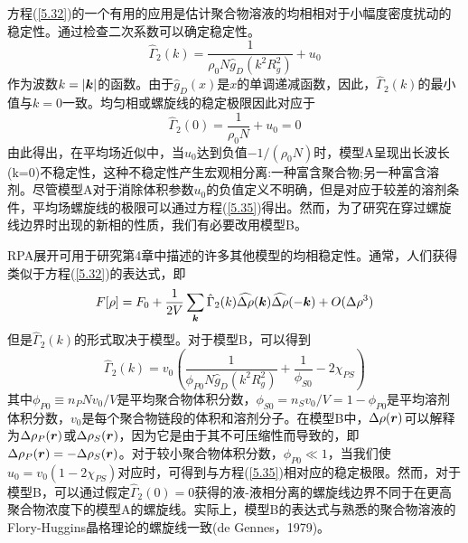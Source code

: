 方程(\ref{5.32})的一个有用的应用是估计聚合物溶液的均相相对于小幅度密度扰动的稳定性。通过检查二次系数可以确定稳定性。
\begin{equation}\label{5.34}
\hat{\Gamma}_2(k)=\frac{1}{\rho_0N\hat{g}_D(k^2R_g^2)}+u_0
\end{equation}
作为波数$k=\left|\bm{k}\right|$的函数。由于$\hat{g}_D(x)$是$x$的单调递减函数，因此，$\hat{\Gamma}_2(k)$的最小值与$k=0$一致。均匀相或螺旋线的稳定极限因此对应于
\begin{equation}\label{5.35}
\hat{\Gamma}_2(0)=\frac{1}{\rho_0N}+u_0=0
\end{equation}
由此得出，在平均场近似中，当$u_0$达到负值$-1/(\rho_0N)$时，模型A呈现出长波长(k=0)不稳定性，这种不稳定性产生宏观相分离:一种富含聚合物;另一种富含溶剂。尽管模型A对于消除体积参数$u_0$的负值定义不明确，但是对应于较差的溶剂条件，平均场螺旋线的极限可以通过方程(\ref{5.35})得出。然而，为了研究在穿过螺旋线边界时出现的新相的性质，我们有必要改用模型B。

RPA展开可用于研究第4章中描述的许多其他模型的均相稳定性。通常，人们获得类似于方程(\ref{5.32})的表达式，即
\begin{equation}\label{5.36}
F[\rho]=F_0+\frac{1}{2V}\sum\limits_{\bm{k}}\hat{\Gamma}_2(k)\widehat{\Delta\rho}(\bm{k})\widehat{\Delta\rho}(-\bm{k})+O(\Delta\rho^3)
\end{equation}
但是$\hat{\Gamma}_2(k)$的形式取决于模型。对于模型B，可以得到
\begin{equation}\label{5.37}
\hat{\Gamma}_2(k)=v_0\left(\frac{1}{\phi_{P0}N\hat{g}_D(k^2R_g^2)}+\frac{1}{\phi_{S0}}-2\chi_{PS}\right)
\end{equation}
其中$\phi_{P0}\equiv n_PNv_0/V$是平均聚合物体积分数，$\phi_{S0}=n_Sv_0/V=1-\phi_{P0}$是平均溶剂体积分数，$v_0$是每个聚合物链段的体积和溶剂分子。在模型B中，$\Delta\rho(\bm{r})$可以解释为$\Delta\rho_P(\bm{r})$或$\Delta\rho_S(\bm{r})$，因为它是由于其不可压缩性而导致的，即$\Delta\rho_P(\bm{r})=-\Delta\rho_S(\bm{r})$。对于较小聚合物体积分数，$\phi_{P0}\ll 1$，当我们使$u_0=v_0(1-2\chi_{PS})$对应时，可得到与方程(\ref{5.35})相对应的稳定极限。然而，对于模型B，可以通过假定$\hat{\Gamma}_2(0)=0$获得的液-液相分离的螺旋线边界不同于在更高聚合物浓度下的模型A的螺旋线。实际上，模型B的表达式与熟悉的聚合物溶液的Flory-Huggins晶格理论的螺旋线一致(de Gennes，1979)。


